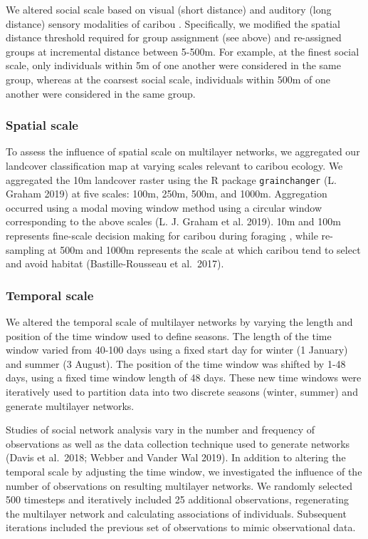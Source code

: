 \documentclass[]{article}
\begin{document}
We altered social scale based on visual (short distance) and auditory (long
distance) sensory modalities of caribou . Specifically, we modified
the spatial distance threshold required for group assignment (see above) and
re-assigned groups at incremental distance between 5-500m. For example, at the
finest social scale, only individuals within 5m of one another were considered
in the same group, whereas at the coarsest social scale, individuals within 500m
of one another were considered in the same group.

\hypertarget{spatial-scale}{%
\subsubsection{Spatial scale}\label{spatial-scale}}

To assess the influence of spatial scale on multilayer networks, we aggregated
our landcover classification map at varying scales relevant to caribou ecology.
We aggregated the 10m landcover raster using the R package \texttt{grainchanger}
(L. Graham 2019) at five scales: 100m, 250m, 500m, and 1000m. Aggregation occurred
using a modal moving window method using a circular window corresponding to the
above scales (L. J. Graham et al. 2019). 10m and 100m represents fine-scale decision making
for caribou during foraging , while re-sampling at 500m and 1000m
represents the scale at which caribou tend to select and avoid habitat
(Bastille-Rousseau et al.~2017).

\hypertarget{temporal-scale}{%
\subsubsection{Temporal scale}\label{temporal-scale}}

We altered the temporal scale of multilayer networks by varying the length and
position of the time window used to define seasons. The length of the time
window varied from 40-100 days using a fixed start day for winter (1 January)
and summer (3 August). The position of the time window was shifted by 1-48 days,
using a fixed time window length of 48 days. These new time windows were
iteratively used to partition data into two discrete seasons (winter, summer)
and generate multilayer networks.

Studies of social network analysis vary in the number and frequency of
observations as well as the data collection technique used to generate networks
(Davis et al.~2018; Webber and Vander Wal 2019). In addition to altering the
temporal scale by adjusting the time window, we investigated the influence of
the number of observations on resulting multilayer networks. We randomly
selected 500 timesteps and iteratively included 25 additional observations,
regenerating the multilayer network and calculating associations of individuals.
Subsequent iterations included the previous set of observations to mimic
observational data.
\end{document}
